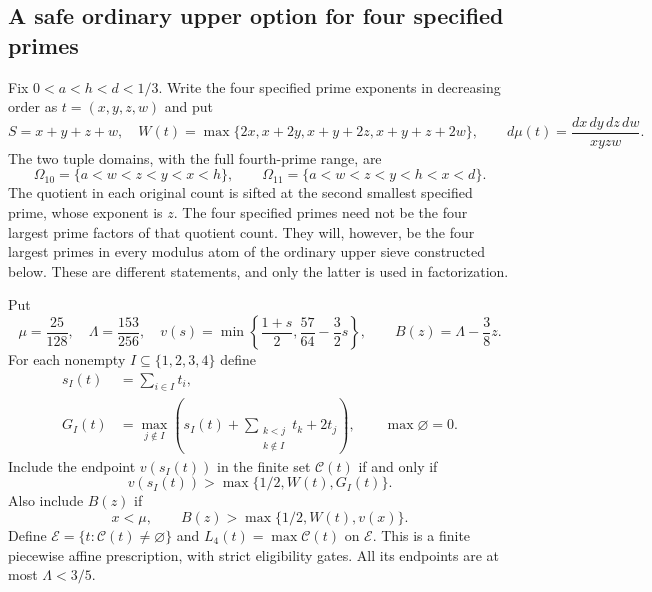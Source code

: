 
\subsection{A safe ordinary upper option for four specified primes}
\label{sec:four-prefix-safe-minimum}

Fix $0<a<h<d<1/3$.  Write the four specified prime exponents in
decreasing order as $t=(x,y,z,w)$ and put
\[
 S=x+y+z+w,\quad
 W(t)=\max\{2x,x+2y,x+y+2z,x+y+z+2w\},
 \qquad d\mu(t)=\frac{dx\,dy\,dz\,dw}{xyzw}.
\]
The two tuple domains, with the full fourth-prime range, are
\[
 \Omega_{10}=\{a<w<z<y<x<h\},\qquad
 \Omega_{11}=\{a<w<z<y<h<x<d\}.
\]
The quotient in each original count is sifted at the second smallest
specified prime, whose exponent is $z$.  The four specified primes
need not be the four largest prime factors of that quotient count.
They will, however, be the four largest primes in every modulus atom
of the ordinary upper sieve constructed below.  These are different
statements, and only the latter is used in factorization.

Put
\[
 \mu=\frac{25}{128},\quad \Lambda=\frac{153}{256},\quad
 v(s)=\min\left\{\frac{1+s}{2},\frac{57}{64}-\frac32s\right\},
 \qquad B(z)=\Lambda-\frac38z.
\]
For each nonempty $I\subseteq\{1,2,3,4\}$ define
\begin{align*}
 s_I(t)&=\sum_{i\in I}t_i,\\
 G_I(t)&=\max_{j\notin I}
       \left(s_I(t)+\sum_{\substack{k<j\\k\notin I}}t_k+2t_j\right),
       \qquad \max\varnothing=0.
\end{align*}
Include the endpoint $v(s_I(t))$ in the finite set $\mathcal C(t)$
if and only if
\begin{equation}\label{eq:four-prefix-subset-gate}
 v(s_I(t))>\max\{1/2,W(t),G_I(t)\}.
\end{equation}
Also include $B(z)$ if
\begin{equation}\label{eq:four-prefix-W-gate}
 x<\mu,\qquad B(z)>\max\{1/2,W(t),v(x)\}.
\end{equation}
Define $\mathcal E=\{t:\mathcal C(t)\ne\varnothing\}$ and
$L_4(t)=\max\mathcal C(t)$ on $\mathcal E$.  This is a finite
piecewise affine prescription, with strict eligibility gates.  All
its endpoints are at most $\Lambda<3/5$.

